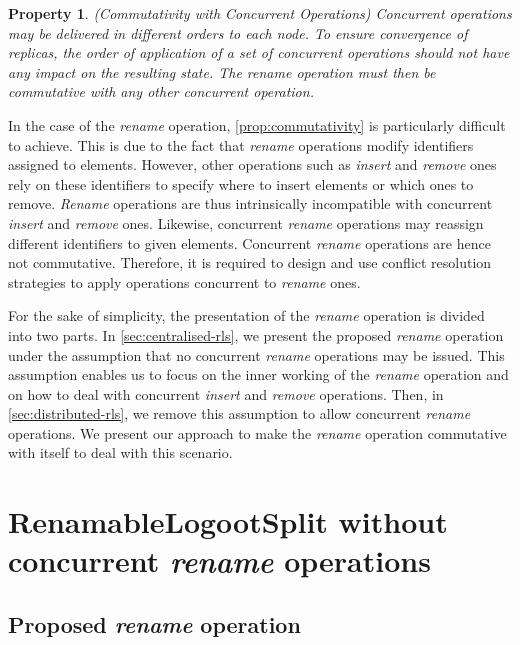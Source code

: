 \documentclass[10pt,journal,compsoc]{IEEEtran}
\newtheorem{property}{Property}
\begin{document}
\begin{property}(Commutativity with Concurrent Operations)
    \label{prop:commutativity}
    Concurrent operations may be delivered in different orders to each node.
    To ensure convergence of replicas, the order of application of a set of concurrent operations should not have any impact on the resulting state.
    The \emph{rename} operation must then be commutative with any other concurrent operation.
\end{property}

In the case of the \emph{rename} operation, \autoref{prop:commutativity} is particularly difficult to achieve.
This is due to the fact that \emph{rename} operations modify identifiers assigned to elements.
However, other operations such as \emph{insert} and \emph{remove} ones rely on these identifiers to specify where to insert elements or which ones to remove.
\emph{Rename} operations are thus intrinsically incompatible with concurrent \emph{insert} and \emph{remove} ones.
Likewise, concurrent \emph{rename} operations may reassign different identifiers to given elements.
Concurrent \emph{rename} operations are hence not commutative.
Therefore, it is required to design and use conflict resolution strategies to apply operations concurrent to \emph{rename} ones.

For the sake of simplicity, the presentation of the \emph{rename} operation is divided into two parts.
In \autoref{sec:centralised-rls}, we present the proposed \emph{rename} operation under the assumption that no concurrent \emph{rename} operations may be issued.
This assumption enables us to focus on the inner working of the \emph{rename} operation and on how to deal with concurrent \emph{insert} and \emph{remove} operations.
Then, in \autoref{sec:distributed-rls}, we remove this assumption to allow concurrent \emph{rename} operations.
We present our approach to make the \emph{rename} operation commutative with itself to deal with this scenario.

\section{RenamableLogootSplit without concurrent \emph{rename} operations}
\label{sec:centralised-rls}

\subsection{Proposed \emph{rename} operation}
\end{document}

